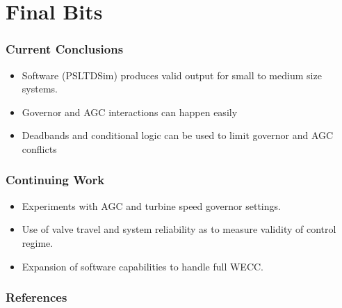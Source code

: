 \documentclass[14pt, unknownkeysallowed]{beamer}
\begin{document}
\section{Final Bits}
\begin{frame}
\frametitle{Current Conclusions}
\begin{itemize}
	\item Software (PSLTDSim) produces valid output for small to medium size systems.
	\item Governor and AGC interactions can happen easily
	\item Deadbands and conditional logic can be used to limit governor and AGC conflicts
\end{itemize}
\end{frame}
\begin{frame}
\frametitle{Continuing Work}
\begin{itemize}
\item Experiments with AGC and turbine speed governor settings.
\item Use of valve travel and system reliability as to measure validity of control regime.
\item Expansion of software capabilities to handle full WECC.
\end{itemize}
\end{frame}

\begin{frame}
\end{frame}

\begin{frame}[allowframebreaks]
\frametitle{References}
\renewcommand*{\bibfont}{\scriptsize} %
\printbibliography
\end{frame}
\end{document}
